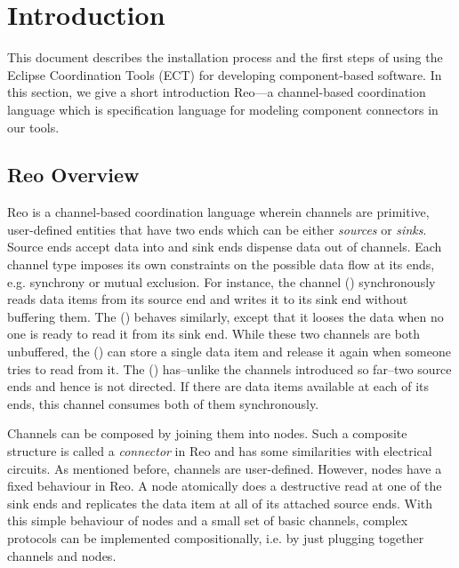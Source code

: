 
\section{Introduction}
\label{sec:introduction}

This document describes the installation process and the first steps
of using the Eclipse Coordination Tools (ECT) for developing
component-based software. In this section, we give a short introduction Reo---a
channel-based coordination language which is specification language for
modeling component connectors in our tools.

\subsection{Reo Overview}
\label{sec:reo-overview}

Reo is a channel-based coordination language wherein channels are primitive,
user-defined entities that have two ends which can be either \emph{sources} or
\emph{sinks}. Source ends accept data into and sink ends dispense
data out of channels.
%
%
Each channel type imposes its own constraints on the possible data flow at its
ends, e.g. synchrony or mutual exclusion. For instance, the \Sync channel
(\sync) synchronously reads data items from its source end and writes it to its
sink end without buffering them. The \LossySync (\lossysync) behaves
similarly, except that it looses the data when no one is ready
to read it from its sink end. While these two channels are both unbuffered, the
\FIFO (\fifo) can store a single data item and release it again when someone
tries to read from it. The \SyncDrain (\syncdrain) has--unlike the channels
introduced so far--two source ends and hence is not directed. If there are data items
available at each of its ends, this channel consumes both of them synchronously.


Channels can be composed by joining them into nodes. Such a composite structure
is called a \emph{connector} in Reo and has some similarities with electrical
circuits. As mentioned before, channels are user-defined. However, nodes have 
a fixed behaviour in Reo. A node atomically does a destructive read at one
of the sink ends and replicates the data item at all of its attached source ends.
With this simple behaviour of nodes and a small set of basic channels, complex
protocols can be implemented compositionally, i.e. by just plugging together
channels and nodes.

